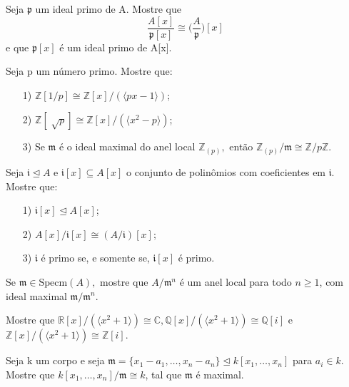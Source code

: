 \documentclass[algebraII_notes.tex]{subfiles}
\begin{document}
\begin{prop*}[Exercício]
	Seja \(\mathfrak{p}\) um ideal primo de A. Mostre que
	\[
		\frac{A[x]}{\mathfrak{p}[x]}\cong{\biggl(\frac{A}{\mathfrak{p}}\biggr)}[x]
	\]
	e que \(\mathfrak{p}[x]\) é um ideal primo de A[x].
\end{prop*}
\begin{example}[Exercício]
	Seja p um número primo. Mostre que:
	\begin{itemize}
		\item[1)] \(\mathbb{Z}[1/p]\cong \mathbb{Z}[x]/(\langle px-1 \rangle)\);
		\item[2)] \(\mathbb{Z}[\sqrt[]{p}]\cong \mathbb{Z}[x]/(\langle x^{2}-p \rangle)\);
		\item[3)] Se \(\mathfrak{m}\) é o ideal maximal do anel local \(\mathbb{Z}_{(p)},\) então \(\mathbb{Z}_{(p)}/\mathfrak{m}\cong{\mathbb{Z}/p \mathbb{Z}}.\)
	\end{itemize}
\end{example}
\begin{prop*}[Exercício]
	Seja \(\mathfrak{i}\trianglelefteq{A}\) e \(\mathfrak{i}[x]\subseteq A[x]\) o conjunto de polinômios
	com coeficientes em \(\mathfrak{i}.\) Mostre que:
	\begin{itemize}
		\item[1)] \(\mathfrak{i}[x] \trianglelefteq{A[x]}\);
		\item[2)] \(A[x]/\mathfrak{i}[x]\cong{(A/\mathfrak{i})}[x];\)
		\item[3)] \(\mathfrak{i}\) é primo se, e somente se, \(\mathfrak{i}[x]\) é primo.
	\end{itemize}
\end{prop*}
\begin{prop*}[Exercício]
	Se \(\mathfrak{m}\in \mathrm{Specm}(A),\) mostre que \(A/\mathfrak{m}^{n}\) é um anel local para todo
	\(n \geq 1\), com ideal maximal \(\mathfrak{m}/\mathfrak{m}^{n}.\)
\end{prop*}
\begin{example}[Exercício]
	Mostre que \(\mathbb{R}[x]/(\langle x^{2}+1 \rangle)\cong{\mathbb{C}}, \mathbb{Q}[x]/(\langle x^{2}+1 \rangle)\cong{\mathbb{Q}[i]}\)
	e \(\mathbb{Z}[x]/(\langle x^{2}+1 \rangle)\cong{\mathbb{Z}[i]}.\)
\end{example}
\begin{prop*}[Exercício]
	Seja k um corpo e seja \(\mathfrak{m} = \{x_{1}-a_{1}, \dotsc, x_{n}-a_{n}\}\trianglelefteq{k[x_{1}, \dotsc, x_{n}]}\) para
	\(a_{i}\in k.\) Mostre que \(k[x_{1}, \dotsc, x_{n}]/\mathfrak{m}\cong{k}\), tal que \(\mathfrak{m}\) é maximal.
\end{prop*}
\end{document}
